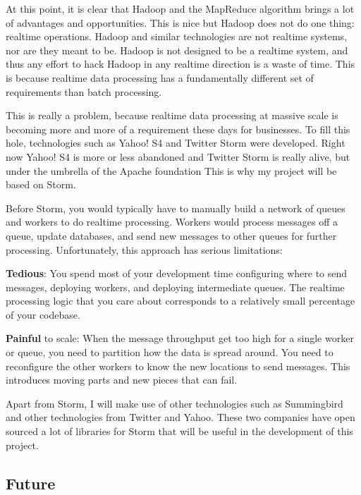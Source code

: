 At this point, it is clear that Hadoop and the MapReduce algorithm brings a lot
of advantages and opportunities. This is nice but Hadoop does not do one thing:
realtime operations. Hadoop and similar technologies are not realtime systems,
nor are they meant to be. Hadoop is not designed to be a realtime system, and
thus any effort to hack Hadoop in any realtime direction is a waste of time.
This is because realtime data processing has a fundamentally different set of
requirements than batch processing.

This is really a problem, because realtime data processing at massive scale is
becoming more and more of a requirement these days for businesses. To fill this
hole, technologies such as Yahoo! S4 and Twitter Storm\cite{storm} were
developed. Right now Yahoo! S4 is more or less abandoned and Twitter Storm is
really alive, but under the umbrella of the Apache foundation\cite{apache} This
is why my project will be based on Storm.

Before Storm, you would typically have to manually build a network of queues and
workers to do realtime processing. Workers would process messages off a queue,
update databases, and send new messages to other queues for further processing.
Unfortunately, this approach has serious limitations:

\mylist
\item {\bf Tedious}: You spend most of your development time configuring where to send
messages, deploying workers, and deploying intermediate queues. The realtime
processing logic that you care about corresponds to a relatively small
percentage of your codebase.
\item {\bf Painful} to scale: When the message throughput get too high for a single worker
or queue, you need to partition how the data is spread around. You need to
reconfigure the other workers to know the new locations to send messages. This
introduces moving parts and new pieces that can fail.
\mylistend

Apart from Storm, I will make use of other technologies such as
Summingbird\cite{summingbird} and other technologies from Twitter\cite{twitter}
and Yahoo\cite{yahoo}. These two companies have open sourced a lot of libraries
for Storm that will be useful in the development of this project.

\subsection{Future}

